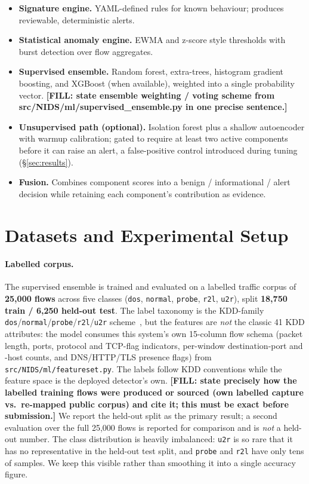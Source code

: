 \documentclass[11pt]{article}
\newcommand{\code}[1]{\texttt{#1}}
\newcommand{\FILL}[1]{\textbf{[FILL: #1]}}
\begin{document}
\begin{itemize}
  \item \textbf{Signature engine.} YAML-defined rules for known behaviour; produces
        reviewable, deterministic alerts.
  \item \textbf{Statistical anomaly engine.} EWMA and z-score style thresholds with
        burst detection over flow aggregates.
  \item \textbf{Supervised ensemble.} Random forest, extra-trees, histogram
        gradient boosting, and XGBoost (when available), weighted into a single
        probability vector. \FILL{state ensemble weighting / voting scheme from
        src/NIDS/ml/supervised\_ensemble.py in one precise sentence.}
  \item \textbf{Unsupervised path (optional).} Isolation forest plus a shallow
        autoencoder with warmup calibration; gated to require at least two active
        components before it can raise an alert, a false-positive control
        introduced during tuning (\S\ref{sec:results}).
  \item \textbf{Fusion.} Combines component scores into a benign / informational /
        alert decision while retaining each component's contribution as evidence.
\end{itemize}

\section{Datasets and Experimental Setup}
\label{sec:data}

\paragraph{Labelled corpus.} The supervised ensemble is trained and evaluated on a
labelled traffic corpus of \textbf{25{,}000 flows} across five classes
(\code{dos}, \code{normal}, \code{probe}, \code{r2l}, \code{u2r}), split
\textbf{18{,}750 train / 6{,}250 held-out test}. The label taxonomy is the
KDD-family \code{dos}/\code{normal}/\code{probe}/\code{r2l}/\code{u2r}
scheme~\cite{nslkdd}, but the features are \emph{not} the classic 41 KDD
attributes: the model consumes this system's own 15-column flow schema (packet
length, ports, protocol and TCP-flag indicators, per-window destination-port and
-host counts, and DNS/HTTP/TLS presence flags) from
\code{src/NIDS/ml/featureset.py}. The labels follow KDD conventions while the
feature space is the deployed detector's own. \FILL{state precisely how the
labelled training flows were produced or sourced (own labelled capture vs.\
re-mapped public corpus) and cite it; this must be exact before submission.}
We report the held-out split as the
primary result; a second evaluation over the full 25{,}000 flows is reported for
comparison and is \emph{not} a held-out number. The class distribution is heavily
imbalanced: \code{u2r} is so rare that it has no representative in the held-out
test split, and \code{probe} and \code{r2l} have only tens of samples. We keep
this visible rather than smoothing it into a single accuracy figure.
\end{document}

